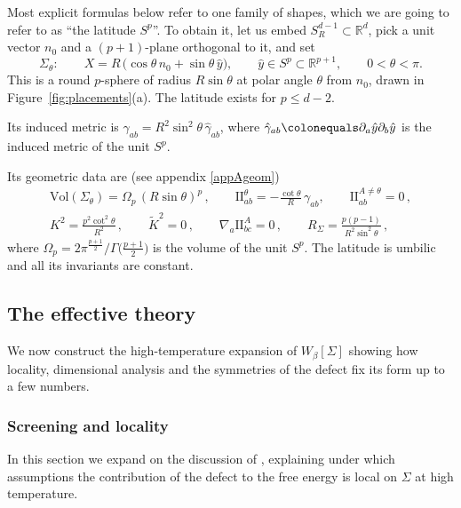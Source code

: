 \documentclass[a4paper,11pt]{article}
\newcommand{\II}{\mathrm{I\!I}}
\newcommand{\Kt}{\widetilde{K}}
\begin{document}
Most explicit formulas below refer to one family of shapes, which we are going to refer to as ``the latitude $S^p$''. To obtain it, let us embed $S^{d-1}_R\subset\mathbb{R}^d$, pick a unit vector $n_0$ and a $(p+1)$-plane orthogonal to it, and set
\begin{equation}\label{eq:lat}
	\Sigma_\theta:\qquad X=R\,\bigl(\cos\theta\,n_0+\sin\theta\,\hat y\bigr),\qquad \hat y\in S^p\subset\mathbb{R}^{p+1},\qquad 0<\theta<\pi .
\end{equation}
This is a round $p$-sphere of radius $R\sin\theta$ at polar angle $\theta$ from $n_0$, drawn in Figure~\ref{fig:placements}(a). The latitude exists for $p\le d-2$.

Its induced metric is $\gamma_{ab}=R^2\sin^2\theta\,\hat\gamma_{ab}$, where $\hat\gamma_{ab} \colonequals \partial_a \hat y \partial_b \hat y$ is the induced metric of the unit $S^p$. 

Its geometric data are (see appendix \ref{appAgeom})
\begin{equation}\label{eq:latdata}
	\begin{gathered}
		\mathrm{Vol}(\Sigma_\theta)=\Omega_p\,(R\sin\theta)^p\, ,\qquad
		\II^{\theta}_{ab}=-\frac{\cot\theta}{R}\,\gamma_{ab},\qquad \II^{A\neq\theta}_{ab}=0\, ,\\
		K^2=\frac{p^2\cot^2\theta}{R^2}\, ,\qquad \Kt^2=0\, ,\qquad \nabla_a\II^A_{bc}=0\, ,\qquad R_\Sigma=\frac{p(p-1)}{R^2\sin^2\theta}\, ,
	\end{gathered}
\end{equation}
where $\Omega_p=2\pi^{\frac{p+1}{2}}/\Gamma\bigl(\tfrac{p+1}{2}\bigr)$ is the volume of the unit $S^p$. The latitude is umbilic and all its invariants are constant.

\subsection{The effective theory}\label{sec:eft}

We now construct the high-temperature expansion of $W_\beta[\Sigma]$ showing how locality, dimensional analysis and the symmetries of the defect fix its form up to a few numbers.

\subsubsection{Screening and locality}\label{sec:screening}

In this section we expand on the discussion of \cite{BMP}, explaining under which assumptions the contribution of the defect to the free energy is local on $\Sigma$ at high temperature.
\end{document}
